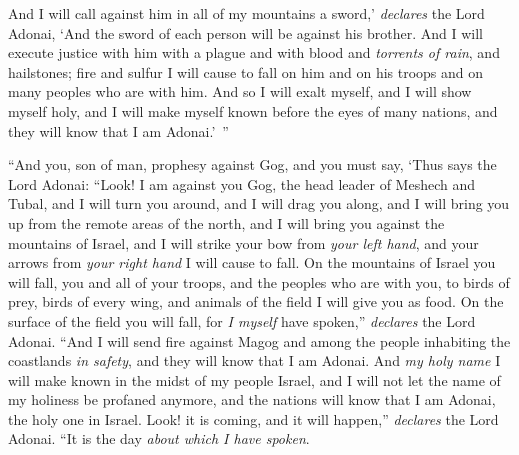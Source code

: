\begin{biblechapter}
\verse And I will call against him in all of my mountains a sword,’ \textit{declares} the Lord Adonai, ‘And the sword of each person will be against his brother.
\verse And I will execute justice with him with a plague and with blood and \textit{torrents of rain}, and hailstones; fire and sulfur I will cause to fall on him and on his troops and on many peoples who are with him.
\verse And so I will exalt myself, and I will show myself holy, and I will make myself known before the eyes of many nations, and they will know that I am Adonai.’ ”
\end{biblechapter}

\begin{biblechapter} %
 “And you, son of man, prophesy against Gog, and you must say, ‘Thus says the Lord Adonai: “Look! I am against you Gog, the head leader of Meshech and Tubal,
\verse and I will turn you around, and I will drag you along, and I will bring you up from the remote areas of the north, and I will bring you against the mountains of Israel,
\verse and I will strike your bow from \textit{your left hand}, and your arrows from \textit{your right hand} I will cause to fall.
\verse On the mountains of Israel you will fall, you and all of your troops, and the peoples who are with you, to birds of prey, birds of every wing, and animals of the field I will give you as food.
\verse On the surface of the field you will fall, for \textit{I myself} have spoken,” \textit{declares} the Lord Adonai.
\verse “And I will send fire against Magog and among the people inhabiting the coastlands \textit{in safety}, and they will know that I am Adonai.
\verse And \textit{my holy name} I will make known in the midst of my people Israel, and I will not let the name of my holiness be profaned anymore, and the nations will know that I am Adonai, the holy one in Israel.
\verse Look! it is coming, and it will happen,” \textit{declares} the Lord Adonai. “It is the day \textit{about which I have spoken}.

\end{biblechapter}
